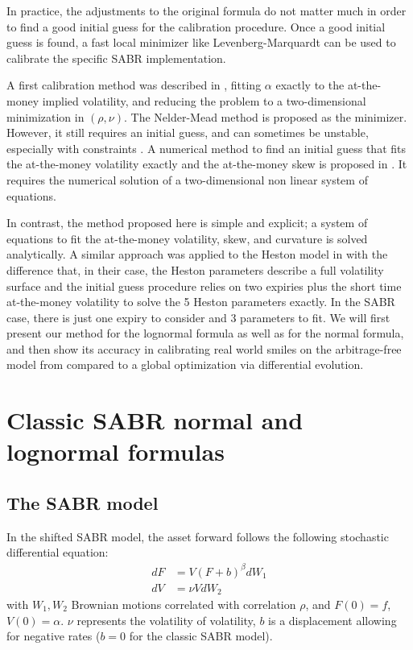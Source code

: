 \documentclass[]{rAMF2e}
\begin{document}
In practice, the adjustments to the original formula do not matter much in order to find a good initial guess for the calibration procedure. Once a good initial guess is found, a fast local minimizer like Levenberg-Marquardt can be used to calibrate the specific SABR implementation. 

A first calibration method was described in \citep{west2005calibration}, fitting $\alpha$ exactly to the at-the-money implied volatility, and reducing the problem to a two-dimensional minimization in $(\rho,\nu)$. The Nelder-Mead method is proposed as the minimizer. However, it still requires an initial guess, and can sometimes be unstable, especially with constraints \citep{lefloch2014nelder}. A numerical method to find an initial guess that fits the at-the-money volatility exactly and the at-the-money skew is proposed in \citep{gauthier2009fitting}. It requires the numerical solution of a two-dimensional non linear system of equations.

In contrast, the method proposed here is simple and explicit; a system of equations to fit the at-the-money volatility, skew, and curvature is solved analytically. A similar approach was applied to the Heston model in \citep{forde2012small} with the difference that, in their case, the Heston parameters describe a full volatility surface and the initial guess procedure relies on two expiries plus the short time at-the-money volatility to solve the 5 Heston parameters exactly. In the SABR case, there is just one expiry to consider and 3 parameters to fit. We will first present our method for the lognormal formula as well as for the normal formula, and then show its accuracy in calibrating real world smiles on the arbitrage-free model from \citet{hagan2013arbitrage} compared to a global optimization via differential evolution.


\section{Classic SABR normal and lognormal formulas}

\subsection{The SABR model}
In the shifted SABR model, the asset forward follows the following stochastic differential equation:
\begin{align}
dF &= V (F+b)^\beta dW_1\\
dV &= \nu V dW_2
\end{align}
with $W_1, W_2$ Brownian motions correlated with correlation $\rho$,
and $F(0) = f$, $V(0) = \alpha$.
$\nu$ represents the volatility of volatility, $b$ is a displacement allowing for negative rates ($b=0$ for the classic SABR model).
\end{document}
